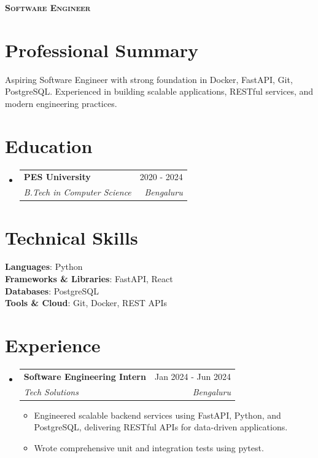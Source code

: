 \documentclass[letterpaper,10pt]{article}
\makeatletter
\newcommand{\resumeItem}[1]{
  \item\small{
    {#1 \vspace{-2pt}}
  }
}
\newcommand{\resumeSubheading}[4]{
  \vspace{-2pt}\item
    \begin{tabular*}{0.97\textwidth}[t]{l@{\extracolsep{\fill}}r}
      \textbf{#1} & #2 \\
      \textit{\small#3} & \textit{\small #4} \\
    \end{tabular*}\vspace{-7pt}
}
\newcommand{\resumeSubHeadingListStart}{\begin{itemize}[leftmargin=0.15in, label={}]}
\newcommand{\resumeSubHeadingListEnd}{\end{itemize}}
\newcommand{\resumeItemListStart}{\begin{itemize}}
\newcommand{\resumeItemListEnd}{\end{itemize}\vspace{-5pt}}
\makeatother
\begin{document}
\begin{center}
    \textbf{\Huge \scshape Software Engineer} \\ \vspace{2pt}
    \small 
                    \end{center}

\section{Professional Summary}
\small{Aspiring Software Engineer with strong foundation in Docker, FastAPI, Git, PostgreSQL. Experienced in building scalable applications, RESTful services, and modern engineering practices.}
\vspace{2pt}

\section{Education}
  \resumeSubHeadingListStart
          \resumeSubheading
        {PES University}{2020 - 2024}
        {B.Tech in Computer Science}{Bengaluru}
      \resumeSubHeadingListEnd

\section{Technical Skills}
 \begin{itemize}[leftmargin=0.15in, label={}]
    \small{\item{
                        \textbf{Languages}: Python \\
                                \textbf{Frameworks & Libraries}: FastAPI, React \\
                                \textbf{Databases}: PostgreSQL \\
                                \textbf{Tools & Cloud}: Git, Docker, REST APIs \\
                                }}
 \end{itemize}

\section{Experience}
  \resumeSubHeadingListStart
          \resumeSubheading
        {Software Engineering Intern}{Jan 2024 - Jun 2024}
        {Tech Solutions}{Bengaluru}
        \resumeItemListStart
                      \resumeItem{Engineered scalable backend services using FastAPI, Python, and PostgreSQL, delivering RESTful APIs for data-driven applications.}
                      \resumeItem{Wrote comprehensive unit and integration tests using pytest.}
                  \resumeItemListEnd
      \resumeSubHeadingListEnd
\end{document}
